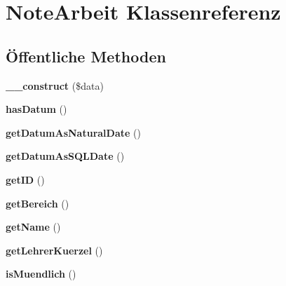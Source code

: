 \hypertarget{class_note_arbeit}{}\section{Note\+Arbeit Klassenreferenz}
\label{class_note_arbeit}
\subsection*{Öffentliche Methoden}
\begin{DoxyCompactItemize}
\item 
\mbox{\label{class_note_arbeit_adb76aba31aab874f8033501eae38bae1}} 
{\bfseries \+\_\+\+\_\+construct} (\$data)
\item 
\mbox{\label{class_note_arbeit_aad17b4e006a2f5c181e4e7c4596c413d}} 
{\bfseries has\+Datum} ()
\item 
\mbox{\label{class_note_arbeit_ae26e413d2978ed9cf2d64f18b1c4fce4}} 
{\bfseries get\+Datum\+As\+Natural\+Date} ()
\item 
\mbox{\label{class_note_arbeit_ae02355fc863375c1b09f1838a91f6084}} 
{\bfseries get\+Datum\+As\+S\+Q\+L\+Date} ()
\item 
\mbox{\label{class_note_arbeit_a520f0597662f6bf6eceb9d20d2b9d75b}} 
{\bfseries get\+ID} ()
\item 
\mbox{\label{class_note_arbeit_a2dc8d9b62d9fd14012395868a513d84b}} 
{\bfseries get\+Bereich} ()
\item 
\mbox{\label{class_note_arbeit_af63cbb35b708833a90aea346f2238d4d}} 
{\bfseries get\+Name} ()
\item 
\mbox{\label{class_note_arbeit_a1141b21445462685129fc6b36871aee0}} 
{\bfseries get\+Lehrer\+Kuerzel} ()
\item 
\mbox{\label{class_note_arbeit_a7bfced310e20fc2a600d6d60e0793b46}} 
{\bfseries is\+Muendlich} ()
\item 
\mbox{\label{class_note_arbeit_a2488feb4ff6e13249f3e1b80464e2f24}} 

\end{DoxyCompactItemize}
